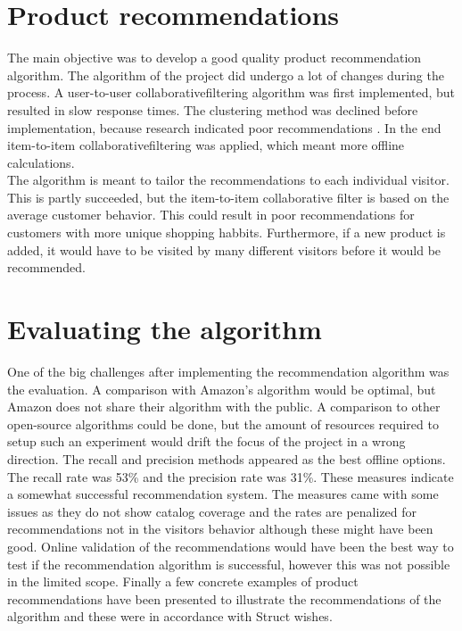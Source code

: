 \section{Product recommendations}
The main objective was to develop a good quality product recommendation algorithm. The algorithm of the project did undergo a lot of changes during the process. A user-to-user \gls{collaborativefiltering} algorithm was first implemented, but resulted in slow response times. The clustering method was declined before implementation, because research indicated poor recommendations \cite{AmazonRecommendations}. In the end item-to-item \gls{collaborativefiltering} was applied, which meant more offline calculations. \\
The algorithm is meant to tailor the recommendations to each individual visitor. This is partly succeeded, but the item-to-item collaborative filter is based on the average customer behavior. This could result in poor recommendations for customers with more unique shopping habbits. Furthermore, if a new product is added, it would have to be visited by many different visitors before it would be recommended.

\section{Evaluating the algorithm}
One of the big challenges after implementing the recommendation algorithm was the evaluation. A comparison with \gls{Amazon}'s algorithm would be optimal, but \gls{Amazon} does not share their algorithm with the public. A comparison to other open-source algorithms could be done, but the amount of resources required to setup such an experiment would drift the focus of the project in a wrong direction. The recall and precision methods appeared as the best offline options. The recall rate was 53\% and the precision rate was 31\%. These measures indicate a somewhat successful recommendation system. The measures came with some issues as they do not show catalog coverage and the rates are penalized for recommendations not in the visitors behavior although these might have been good. Online validation of the recommendations would have been the best way to test if the recommendation algorithm is successful, however this was not possible in the limited scope. Finally a few concrete examples of product recommendations have been presented to illustrate the recommendations of the algorithm and these were in accordance with \gls{Struct} wishes. 